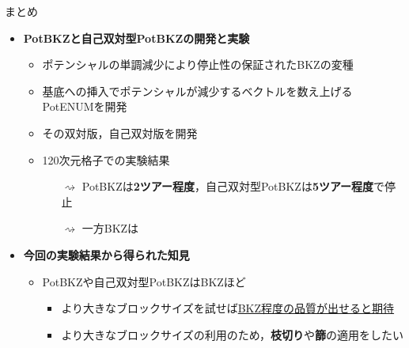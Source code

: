 \documentclass[12pt,aspectratio=169,xcolor=dvipsnames,table,dvipdfmx, leqno]{beamer}
\begin{document}
\begin{frame}{まとめ}
\begin{itemize}
    \item \textbf{PotBKZと自己双対型PotBKZの開発と実験}
    \begin{itemize}
        \item ポテンシャルの単調減少により停止性の保証されたBKZ\cite{SE94}の変種
        \item 基底への挿入でポテンシャルが減少するベクトルを数え上げるPotENUMを開発
        \item その双対版，自己双対版を開発
        \item 120次元格子での実験結果\\
        \begin{itemize}
            \item[$\rightsquigarrow$] \alert{PotBKZは\textbf{2ツアー程度}，自己双対型PotBKZは\textbf{5ツアー程度}で停止}
            \item[$\rightsquigarrow$] 一方BKZは
        \end{itemize}
    \end{itemize}
    \item \textbf{今回の実験結果から得られた知見}
    \begin{itemize}
        \item PotBKZや自己双対型PotBKZはBKZほど
        \begin{itemize}
            \item より大きなブロックサイズを試せば\uline{BKZ程度の品質が出せると期待}
            \item より大きなブロックサイズの利用のため，\textbf{枝切り}や\textbf{篩}の適用をしたい
        \end{itemize}
    \end{itemize}
\end{itemize}
\end{frame}
\end{document}
